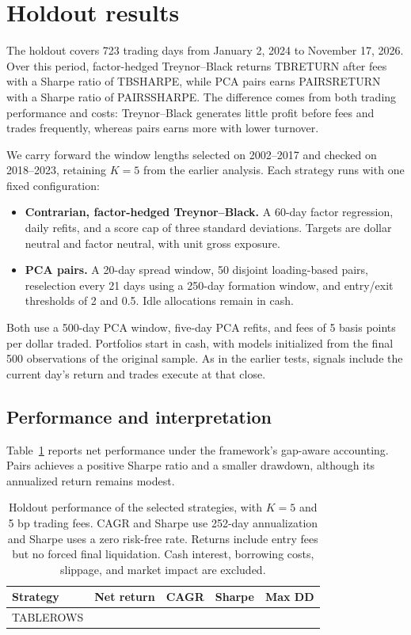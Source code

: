 ﻿\section{Holdout results}
\label{sec:final-holdout}

The holdout covers 723 trading days from January 2, 2024 to November 17,
2026. Over this period, factor-hedged Treynor--Black returns TBRETURN
after fees with a Sharpe ratio of TBSHARPE, while PCA pairs earns
PAIRSRETURN with a Sharpe ratio of PAIRSSHARPE. The difference comes from
both trading performance and costs: Treynor--Black generates little profit
before fees and trades frequently, whereas pairs earns more with lower
turnover.

We carry forward the window lengths selected on 2002--2017 and checked on
2018--2023, retaining $K=5$ from the earlier analysis. Each strategy runs with
one fixed configuration:
\begin{itemize}
    \item \textbf{Contrarian, factor-hedged Treynor--Black.} A 60-day
    factor regression, daily refits, and a score cap of three standard
    deviations. Targets are dollar neutral and factor neutral, with unit
    gross exposure.
    \item \textbf{PCA pairs.} A 20-day spread window, 50 disjoint
    loading-based pairs, reselection every 21 days using a 250-day formation
    window, and entry/exit thresholds of 2 and 0.5. Idle allocations remain
    in cash.
\end{itemize}
Both use a 500-day PCA window, five-day PCA refits, and fees of 5 basis
points per dollar traded. Portfolios start in cash, with models initialized
from the final 500 observations of the original sample. As in the earlier
tests, signals include the current day's return and trades execute at that
close.

\subsection{Performance and interpretation}

Table~\ref{tab:final-holdout} reports net performance under the framework's
gap-aware accounting. Pairs achieves a positive Sharpe ratio and a smaller
drawdown, although its annualized return remains modest.

\begin{table}[htbp]
\centering
\small
\begin{tabular}{lrrrr}
\toprule
Strategy & Net return & CAGR & Sharpe & Max DD \\
\midrule
TABLEROWS
\bottomrule
\end{tabular}
\caption{Holdout performance of the selected strategies, with $K=5$ and
5 bp trading fees. CAGR and Sharpe use 252-day annualization and Sharpe uses
a zero risk-free rate. Returns include entry fees but no forced final
liquidation. Cash interest, borrowing costs, slippage, and market impact
are excluded.}
\label{tab:final-holdout}
\end{table}

